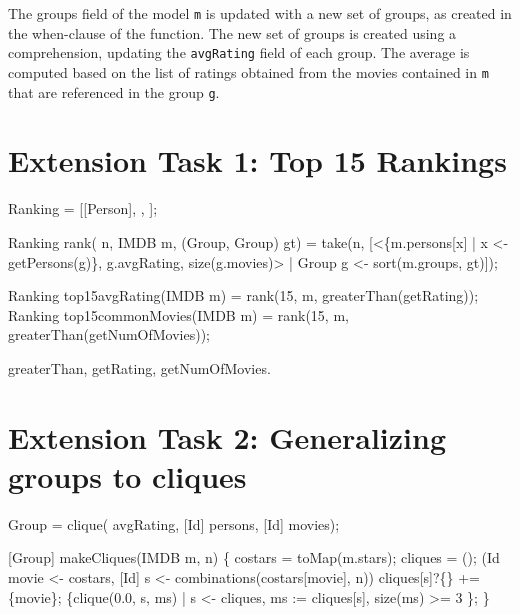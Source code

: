 \documentclass[submission,copyright,creativecommons]{eptcs}
\begin{document}
The groups field of the model \texttt{m} is updated with a new set of groups, as created in the when-clause of the function. 
The new set of groups is created using a comprehension, updating the \texttt{avgRating} field of each group. 
The average is computed based on the list of ratings obtained from the movies contained in \texttt{m} that are referenced in the group \texttt{g}. 

\section{Extension Task 1: Top 15 Rankings}

\begin{rascal}
 Ranking = [[Person], , ]; 

Ranking rank( n, IMDB m, (Group, Group) gt) =
    take(n, 
       {}[\textless{}\{{}m.persons{}[x] | x \textless{}- getPersons(g)\}{}, g.avgRating, size(g.movies)\textgreater{} 
            | Group g \textless{}- sort(m.groups, gt)]);
\end{rascal}    


\begin{rascal}
Ranking top15avgRating(IMDB m)    = rank(15, m, greaterThan(getRating));    
Ranking top15commonMovies(IMDB m) = rank(15, m, greaterThan(getNumOfMovies));
\end{rascal}

greaterThan, getRating, getNumOfMovies.

\section{Extension Task 2: Generalizing groups to cliques}

\begin{rascal}
 Group = clique( avgRating, [Id] persons, [Id] movies);
\end{rascal}


\begin{rascal}
[Group] makeCliques(IMDB m,  n) \{{}
    costars = toMap(m.stars); cliques = ();
     (Id movie \textless{}- costars, [Id] s \textless{}- combinations(costars{}[movie], n))
      cliques{}[s]?\{\} += \{{}movie\}{};
     \{{}clique(0.0, s, ms) | s \textless{}- cliques, ms := cliques{}[s], size(ms) \textgreater{}= 3 \}{};
\}{}
\end{rascal}
\end{document}
